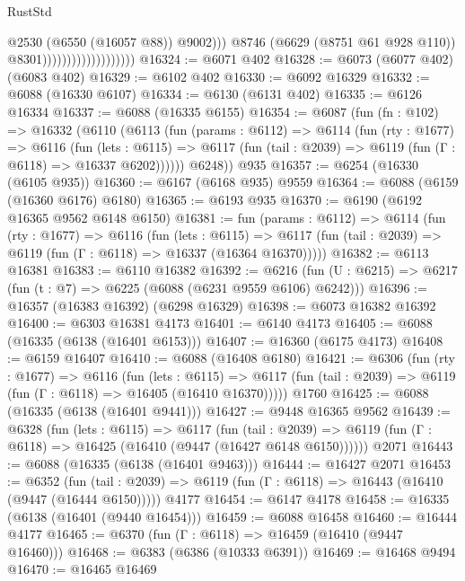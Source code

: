 \begin{lexlean}{RustStd}
\begin{coremodule}
                                                @2530
                                                (@6550 (@16057 @88))
                                                @9002)))
                                          @8746
                                          (@6629 (@8751 @61 @928 @110))
                                          @8301)))))))))))))))))))
@16324 := @6071 @402
@16328 := @6073 (@6077 @402) (@6083 @402)
@16329 := @6102 @402
@16330 := @6092 @16329
@16332 := @6088 (@16330 @6107)
@16334 := @6130 (@6131 @402)
@16335 := @6126 @16334
@16337 := @6088 (@16335 @6155)
@16354 := @6087
    (fun (fn : @102) =>
    @16332
      (@6110
        (@6113
          (fun (params : @6112) =>
          @6114
            (fun (rty : @1677) =>
            @6116
              (fun (lets : @6115) =>
              @6117 (fun (tail : @2039) => @6119 (fun (Γ : @6118) => @16337 @6202))))))
        @6248))
    @935
@16357 := @6254 (@16330 (@6105 @935))
@16360 := @6167 (@6168 @935) @9559
@16364 := @6088 (@6159 (@16360 @6176) @6180)
@16365 := @6193 @935
@16370 := @6190 (@6192 @16365 @9562 @6148 @6150)
@16381 := fun (params : @6112) =>
  @6114
    (fun (rty : @1677) =>
    @6116
      (fun (lets : @6115) =>
      @6117 (fun (tail : @2039) => @6119 (fun (Γ : @6118) => @16337 (@16364 @16370)))))
@16382 := @6113 @16381
@16383 := @6110 @16382
@16392 := @6216 (fun (U : @6215) => @6217 (fun (t : @7) => @6225 (@6088 (@6231 @9559 @6106) @6242)))
@16396 := @16357 (@16383 @16392) (@6298 @16329)
@16398 := @6073 @16382 @16392
@16400 := @6303 @16381 @4173
@16401 := @6140 @4173
@16405 := @6088 (@16335 (@6138 (@16401 @6153)))
@16407 := @16360 (@6175 @4173)
@16408 := @6159 @16407
@16410 := @6088 (@16408 @6180)
@16421 := @6306
    (fun (rty : @1677) =>
    @6116
      (fun (lets : @6115) =>
      @6117 (fun (tail : @2039) => @6119 (fun (Γ : @6118) => @16405 (@16410 @16370)))))
    @1760
@16425 := @6088 (@16335 (@6138 (@16401 @9441)))
@16427 := @9448 @16365 @9562
@16439 := @6328
    (fun (lets : @6115) =>
    @6117
      (fun (tail : @2039) =>
      @6119 (fun (Γ : @6118) => @16425 (@16410 (@9447 (@16427 @6148 @6150))))))
    @2071
@16443 := @6088 (@16335 (@6138 (@16401 @9463)))
@16444 := @16427 @2071
@16453 := @6352
    (fun (tail : @2039) => @6119 (fun (Γ : @6118) => @16443 (@16410 (@9447 (@16444 @6150)))))
    @4177
@16454 := @6147 @4178
@16458 := @16335 (@6138 (@16401 (@9440 @16454)))
@16459 := @6088 @16458
@16460 := @16444 @4177
@16465 := @6370 (fun (Γ : @6118) => @16459 (@16410 (@9447 @16460)))
@16468 := @6383 (@6386 (@10333 @6391))
@16469 := @16468 @9494
@16470 := @16465 @16469

\end{coremodule}
\end{lexlean}
